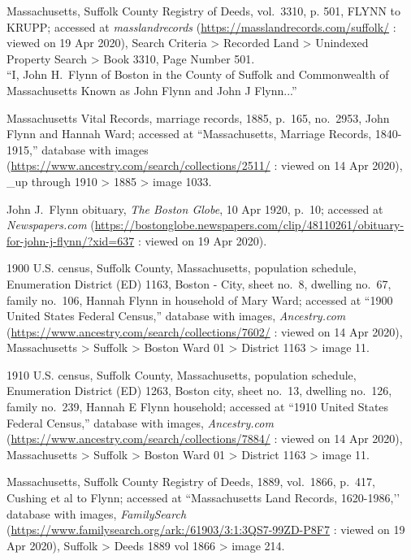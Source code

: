 \begin{thebibliography}{999}
	Massachusetts, Suffolk County Registry of Deeds, vol.\ 3310, p. 501, FLYNN to KRUPP; accessed at \textit{masslandrecords} (\url{https://masslandrecords.com/suffolk/} : viewed on 19 Apr 2020), Search Criteria >  Recorded Land > Unindexed Property Search > Book 3310, Page Number 501.\\
	``I, John H.\ Flynn of Boston in the County of Suffolk and Commonwealth of Massachusetts Known as John Flynn and John J Flynn...''
	
	Massachusetts Vital Records, marriage records, 1885, p.\ 165, no.\ 2953, John Flynn and Hannah Ward; accessed at ``Massachusetts, Marriage Records, 1840-1915,'' database with images (\url{https://www.ancestry.com/search/collections/2511/} : viewed on 14 Apr 2020), \_up through 1910 > 1885 > image 1033.
		
	John J.\ Flynn obituary, \textit{The Boston Globe}, 10 Apr 1920, p.\ 10; accessed at \textit{Newspapers.com} (\url{https://bostonglobe.newspapers.com/clip/48110261/obituary-for-john-j-flynn/?xid=637} : viewed on 19 Apr 2020).
	
	1900 U.S. census, Suffolk County, Massachusetts, population schedule, Enumeration District (ED) 1163, Boston - City, sheet no.\ 8, dwelling no.\ 67, family no.\ 106, Hannah Flynn in household of Mary Ward; accessed at ``1900 United States Federal Census,'' database with images, \textit{Ancestry.com} (\url{https://www.ancestry.com/search/collections/7602/} : viewed on 14 Apr 2020), Massachusetts > Suffolk > Boston Ward 01 > District 1163 > image 11.	
	
	1910 U.S. census, Suffolk County, Massachusetts, population schedule, Enumeration District (ED) 1263, Boston city, sheet no.\ 13, dwelling no.\ 126, family no.\ 239, Hannah E Flynn household; accessed at ``1910 United States Federal Census,'' database with images, \textit{Ancestry.com} (\url{https://www.ancestry.com/search/collections/7884/} : viewed on 14 Apr 2020), Massachusetts > Suffolk > Boston Ward 01 > District 1163 > image 11.
	
	Massachusetts, Suffolk County Registry of Deeds, 1889, vol.\ 1866, p.\ 417, Cushing et al to Flynn; accessed at ``Massachusetts Land Records, 1620-1986,’’ database with images, \textit{FamilySearch} (\url{https://www.familysearch.org/ark:/61903/3:1:3QS7-99ZD-P8F7} : viewed on 19 Apr 2020), Suffolk > Deeds 1889 vol 1866 > image 214.
	

\end{thebibliography}
